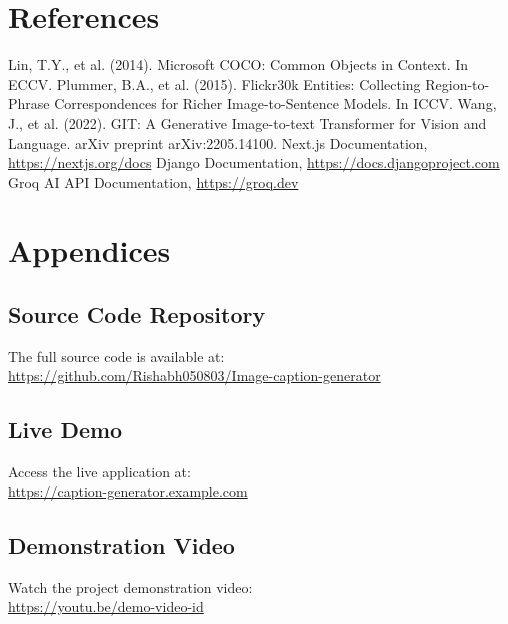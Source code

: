 \documentclass[12pt,a4paper]{report}
\begin{document}
\chapter{References}
\begin{thebibliography}{99}
     Lin, T.Y., et al. (2014). Microsoft COCO: Common Objects in Context. In ECCV.
     Plummer, B.A., et al. (2015). Flickr30k Entities: Collecting Region-to-Phrase Correspondences for Richer Image-to-Sentence Models. In ICCV.
     Wang, J., et al. (2022). GIT: A Generative Image-to-text Transformer for Vision and Language. arXiv preprint arXiv:2205.14100.
     Next.js Documentation, \url{https://nextjs.org/docs}
     Django Documentation, \url{https://docs.djangoproject.com}
     Groq AI API Documentation, \url{https://groq.dev}
\end{thebibliography}

\chapter{Appendices}
\section{Source Code Repository}
The full source code is available at:\\
\url{https://github.com/Rishabh050803/Image-caption-generator}

\section{Live Demo}
Access the live application at:\\
\url{https://caption-generator.example.com}

\section{Demonstration Video}
Watch the project demonstration video:\\
\url{https://youtu.be/demo-video-id}
\end{document}
